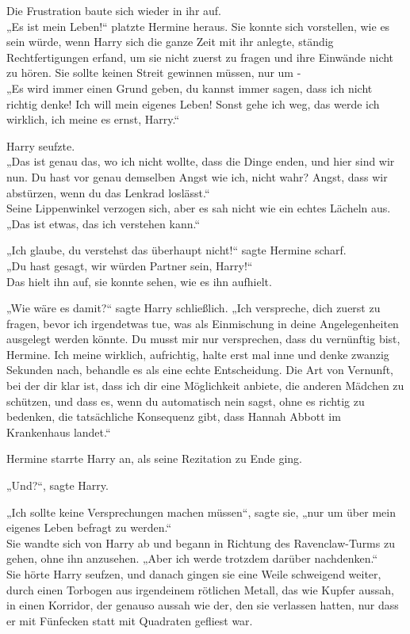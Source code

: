 {Die Frustration baute sich wieder in ihr auf.\\ „Es ist mein Leben!“ platzte Hermine heraus. Sie konnte sich vorstellen, wie es sein würde, wenn Harry sich die ganze Zeit mit ihr anlegte, ständig Rechtfertigungen erfand, um sie nicht zuerst zu fragen und ihre Einwände nicht zu hören. Sie sollte keinen Streit gewinnen müssen, nur um -\\ „Es wird immer einen Grund geben, du kannst immer sagen, dass ich nicht richtig denke! Ich will mein eigenes Leben! Sonst gehe ich weg, das werde ich wirklich, ich meine es ernst, Harry.“

Harry seufzte.\\ „Das ist genau das, wo ich nicht wollte, dass die Dinge enden, und hier sind wir nun. Du hast vor genau demselben Angst wie ich, nicht wahr? Angst, dass wir abstürzen, wenn du das Lenkrad loslässt.“\\ Seine Lippenwinkel verzogen sich, aber es sah nicht wie ein echtes Lächeln aus.\\ „Das ist etwas, das ich verstehen kann.“

„Ich glaube, du verstehst das überhaupt nicht!“ sagte Hermine scharf.\\ „Du hast gesagt, wir würden Partner sein, Harry!“\\ Das hielt ihn auf, sie konnte sehen, wie es ihn aufhielt.

„Wie wäre es damit?“ sagte Harry schließlich. „Ich verspreche, dich zuerst zu fragen, bevor ich irgendetwas tue, was als Einmischung in deine Angelegenheiten ausgelegt werden könnte. Du musst mir nur versprechen, dass du vernünftig bist, Hermine. Ich meine wirklich, aufrichtig, halte erst mal inne und denke zwanzig Sekunden nach, behandle es als eine echte Entscheidung. Die Art von Vernunft, bei der dir klar ist, dass ich dir eine Möglichkeit anbiete, die anderen Mädchen zu schützen, und dass es, wenn du automatisch nein sagst, ohne es richtig zu bedenken, die tatsächliche Konsequenz gibt, dass Hannah Abbott im Krankenhaus landet.“

Hermine starrte Harry an, als seine Rezitation zu Ende ging.

„Und?“, sagte Harry.

„Ich sollte keine Versprechungen machen müssen“, sagte sie, „nur um über mein eigenes Leben befragt zu werden.“\\ Sie wandte sich von Harry ab und begann in Richtung des Ravenclaw-Turms zu gehen, ohne ihn anzusehen. „Aber ich werde trotzdem darüber nachdenken.“\\ Sie hörte Harry seufzen, und danach gingen sie eine Weile schweigend weiter, durch einen Torbogen aus irgendeinem rötlichen Metall, das wie Kupfer aussah, in einen Korridor, der genauso aussah wie der, den sie verlassen hatten, nur dass er mit Fünfecken statt mit Quadraten gefliest war.

}
